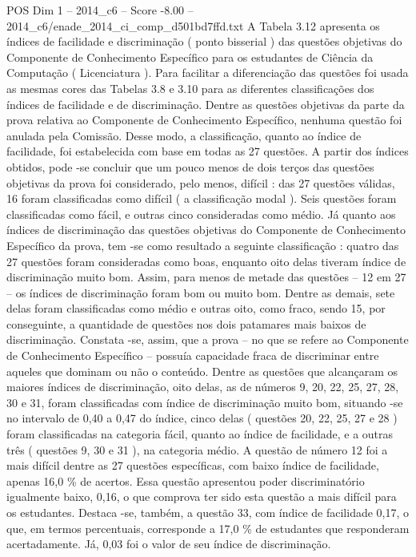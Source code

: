 \begin{textsample}{POS Dim 1 – 2014\_c6 – Score -8.00 – 2014\_c6/enade\_2014\_ci\_comp\_d501bd7ffd.txt}
A Tabela 3.12 apresenta os índices de facilidade e discriminação ( ponto bisserial ) das questões objetivas do Componente de Conhecimento Específico para os estudantes de Ciência da Computação ( Licenciatura ).
Para facilitar a diferenciação das questões foi usada as mesmas cores das Tabelas 3.8 e 3.10 para as diferentes classificações dos índices de facilidade e de discriminação.
Dentre as questões objetivas da parte da prova relativa ao Componente de Conhecimento Específico, nenhuma questão foi anulada pela Comissão.
Desse modo, a classificação, quanto ao índice de facilidade, foi estabelecida com base em todas as 27 questões.
A partir dos índices obtidos, pode -se concluir que um pouco menos de dois terços das questões objetivas da prova foi considerado, pelo menos, difícil : das 27 questões válidas, 16 foram classificadas como difícil ( a classificação modal ).
Seis questões foram classificadas como fácil, e outras cinco consideradas como médio.
Já quanto aos índices de discriminação das questões objetivas do Componente de Conhecimento Específico da prova, tem -se como resultado a seguinte classificação : quatro das 27 questões foram consideradas como boas, enquanto oito delas tiveram índice de discriminação muito bom.
Assim, para menos de metade das questões – 12 em 27 – os índices de discriminação foram bom ou muito bom.
Dentre as demais, sete delas foram classificadas como médio e outras oito, como fraco, sendo 15, por conseguinte, a quantidade de questões nos dois patamares mais baixos de discriminação.
Constata -se, assim, que a prova – no que se refere ao Componente de Conhecimento Específico – possuía capacidade fraca de discriminar entre aqueles que dominam ou não o conteúdo.
Dentre as questões que alcançaram os maiores índices de discriminação, oito delas, as de números 9, 20, 22, 25, 27, 28, 30 e 31, foram classificadas com índice de discriminação muito bom, situando -se no intervalo de 0,40 a 0,47 do índice, cinco delas ( questões 20, 22, 25, 27 e 28 ) foram classificadas na categoria fácil, quanto ao índice de facilidade, e a outras três ( questões 9, 30 e 31 ), na categoria médio.
A questão de número 12 foi a mais difícil dentre as 27 questões específicas, com baixo índice de facilidade, apenas 16,0 \% de acertos.
Essa questão apresentou poder discriminatório igualmente baixo, 0,16, o que comprova ter sido esta questão a mais difícil para os estudantes.
Destaca -se, também, a questão 33, com índice de facilidade 0,17, o que, em termos percentuais, corresponde a 17,0 \% de estudantes que responderam acertadamente.
Já, 0,03 foi o valor de seu índice de discriminação.

\end{textsample}
